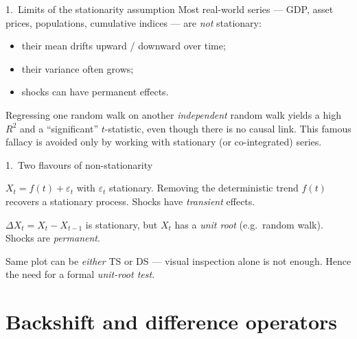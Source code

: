 \documentclass[aspectratio=169]{beamer}
\begin{document}
\begin{frame}{1.~Limits of the stationarity assumption}
  Most real-world series — GDP, asset prices, populations,
  cumulative indices — are \emph{not} stationary:
  \begin{itemize}
    \item their mean drifts upward / downward over time;
    \item their variance often grows;
    \item shocks can have permanent effects.
  \end{itemize}
  \medskip
  \begin{warnbox}
    Regressing one random walk on another \emph{independent} random
    walk yields a high $R^2$ and a ``significant'' $t$-statistic,
    even though there is no causal link. This famous fallacy is
    avoided only by working with stationary (or co-integrated)
    series.
  \end{warnbox}
\end{frame}

\begin{frame}{1.~Two flavours of non-stationarity}
  \begin{defbox}
    $X_t = f(t) + \varepsilon_t$ with $\varepsilon_t$ stationary.
    Removing the deterministic trend $f(t)$ recovers a stationary
    process. Shocks have \emph{transient} effects.
  \end{defbox}
  \medskip
  \begin{defbox}
    $\Delta X_t = X_t - X_{t-1}$ is stationary, but $X_t$ has a
    \emph{unit root} (e.g.\ random walk). Shocks are \emph{permanent}.
  \end{defbox}
  \medskip
  \begin{infobox}
    Same plot can be \emph{either} TS or DS — visual inspection alone
    is not enough. Hence the need for a formal \emph{unit-root test}.
  \end{infobox}
\end{frame}

\section{Backshift and difference operators}
\end{document}
